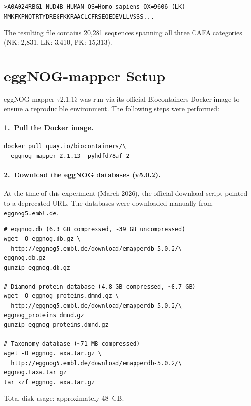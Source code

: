 \begin{verbatim}
>A0A024RBG1 NUD4B_HUMAN OS=Homo sapiens OX=9606 (LK)
MMKFKPNQTRTYDREGFKKRAACLCFRSEQEDEVLLVSSS...
\end{verbatim}

The resulting file contains 20{,}281 sequences spanning all three CAFA categories
(NK: 2{,}831, LK: 3{,}410, PK: 15{,}313).

\section{eggNOG-mapper Setup}
\label{app:ext-emapper-setup}

eggNOG-mapper v2.1.13 was run via its official Biocontainers Docker image
to ensure a reproducible environment. The following steps were performed:

\paragraph{1.\ Pull the Docker image.}
\begin{verbatim}
docker pull quay.io/biocontainers/\
  eggnog-mapper:2.1.13--pyhdfd78af_2
\end{verbatim}

\paragraph{2.\ Download the eggNOG databases (v5.0.2).}
At the time of this experiment (March 2026), the official download script
pointed to a deprecated URL. The databases were downloaded manually from
\texttt{eggnog5.embl.de}:

\begin{verbatim}
# eggnog.db (6.3 GB compressed, ~39 GB uncompressed)
wget -O eggnog.db.gz \
  http://eggnog5.embl.de/download/emapperdb-5.0.2/\
eggnog.db.gz
gunzip eggnog.db.gz

# Diamond protein database (4.8 GB compressed, ~8.7 GB)
wget -O eggnog_proteins.dmnd.gz \
  http://eggnog5.embl.de/download/emapperdb-5.0.2/\
eggnog_proteins.dmnd.gz
gunzip eggnog_proteins.dmnd.gz

# Taxonomy database (~71 MB compressed)
wget -O eggnog.taxa.tar.gz \
  http://eggnog5.embl.de/download/emapperdb-5.0.2/\
eggnog.taxa.tar.gz
tar xzf eggnog.taxa.tar.gz
\end{verbatim}

Total disk usage: approximately 48~GB.

